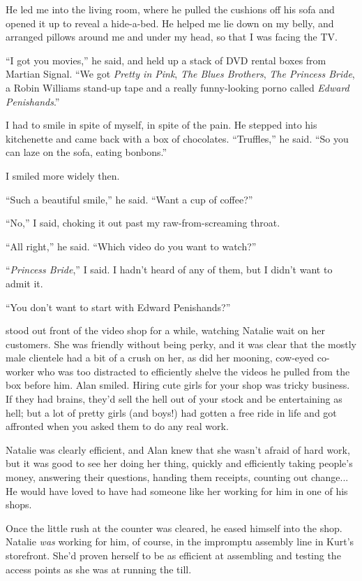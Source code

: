 He led me into the living room, where he pulled the cushions off his
sofa and opened it up to reveal a hide-a-bed.  He helped me lie down
on my belly, and arranged pillows around me and under my head, so that
I was facing the TV.

``I got you movies,'' he said, and held up a stack of DVD rental boxes
from Martian Signal.  ``We got \textit{Pretty in Pink}, \textit{The
Blues Brothers}, \textit{The Princess Bride}, a Robin Williams
stand-up tape and a really funny-looking porno called \textit{Edward
Penishands}.''

I had to smile in spite of myself, in spite of the pain.  He stepped
into his kitchenette and came back with a box of chocolates. 
``Truffles,'' he said.  ``So you can laze on the sofa, eating
bonbons.''

I smiled more widely then.

``Such a beautiful smile,'' he said.  ``Want a cup of coffee?''

``No,'' I said, choking it out past my raw-from-screaming throat.

``All right,'' he said.  ``Which video do you want to watch?''

``\textit{Princess Bride},'' I said.  I hadn't heard of any of them,
but I didn't want to admit it.

``You don't want to start with Edward Penishands?''

 stood out front of the video shop for a while, watching Natalie
wait on her customers.  She was friendly without being perky, and it
was clear that the mostly male clientele had a bit of a crush on her,
as did her mooning, cow-eyed co-worker who was too distracted to
efficiently shelve the videos he pulled from the box before him.  Alan
smiled.  Hiring cute girls for your shop was tricky business.  If they
had brains, they'd sell the hell out of your stock and be entertaining
as hell; but a lot of pretty girls (and boys!) had gotten a free ride
in life and got affronted when you asked them to do any real work.

Natalie was clearly efficient, and Alan knew that she wasn't afraid of
hard work, but it was good to see her doing her thing, quickly and
efficiently taking people's money, answering their questions, handing
them receipts, counting out change...  He would have loved to have had
someone like her working for him in one of his shops.

Once the little rush at the counter was cleared, he eased himself into
the shop.  Natalie \textit{was} working for him, of course, in the
impromptu assembly line in Kurt's storefront.  She'd proven herself to
be as efficient at assembling and testing the access points as she was
at running the till.


